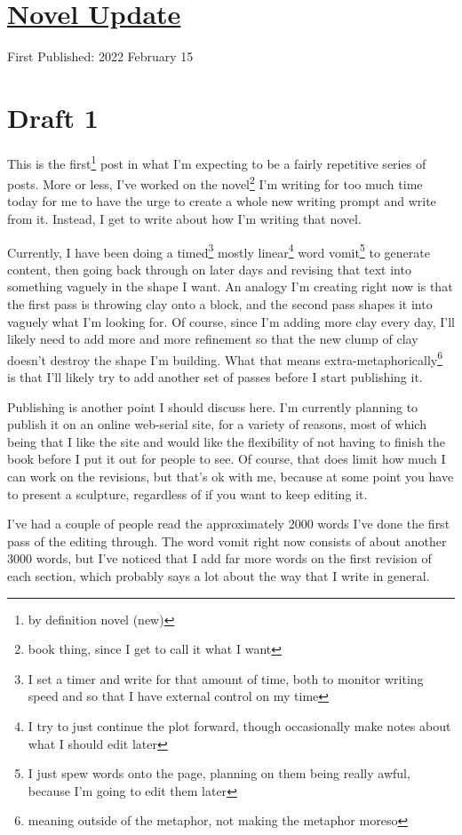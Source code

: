 \documentclass[12pt]{article}[titlepage]
\newcommand{\1}{\={a}}
\newcommand{\2}{\={e}}
\newcommand{\3}{\={\i}}
\newcommand{\4}{\=o}
\newcommand{\5}{\=u}
\newcommand{\6}{\={A}}
\renewcommand{\,}{\textsuperscript{,}}
\begin{document}
\doublespacing
\section{\href{novel-update-1.html}{Novel Update}}
First Published: 2022 February 15

\section{Draft 1}
This is the first\footnote{by definition novel (new)} post in what I'm expecting to be a fairly repetitive series of posts.
More or less, I've worked on the novel\footnote{book thing, since I get to call it what I want} I'm writing for too much time today for me to have the urge to create a whole new writing prompt and write from it.
Instead, I get to write about how I'm writing that novel.

Currently, I have been doing a timed\footnote{I set a timer and write for that amount of time, both to monitor writing speed and so that I have external control on my time} mostly linear\footnote{I try to just continue the plot forward, though occasionally make notes about what I should edit later} word vomit\footnote{I just spew words onto the page, planning on them being really awful, because I'm going to edit them later} to generate content, then going back through on later days and revising that text into something vaguely in the shape I want.
An analogy I'm creating right now is that the first pass is throwing clay onto a block, and the second pass shapes it into vaguely what I'm looking for.
Of course, since I'm adding more clay every day, I'll likely need to add more and more refinement so that the new clump of clay doesn't destroy the shape I'm building.
What that means extra-metaphorically\footnote{meaning outside of the metaphor, not making the metaphor moreso} is that I'll likely try to add another set of passes before I start publishing it.

Publishing is another point I should discuss here.
I'm currently planning to publish it on an online web-serial site, for a variety of reasons, most of which being that I like the site and would like the flexibility of not having to finish the book before I put it out for people to see.
Of course, that does limit how much I can work on the revisions, but that's ok with me, because at some point you have to present a sculpture, regardless of if you want to keep editing it.

I've had a couple of people read the approximately 2000 words I've done the first pass of the editing through.
The word vomit right now consists of about another 3000 words, but I've noticed that I add far more words on the first revision of each section, which probably says a lot about the way that I write in general.
\end{document}
